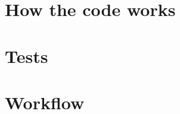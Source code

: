 \documentclass[11pt, letterpaper, onecolumn]{article}
\begin{document}
    
    
    
    
    \section{How the code works}








    

    \section{Tests}


















\section{Workflow}
    
\end{document}
